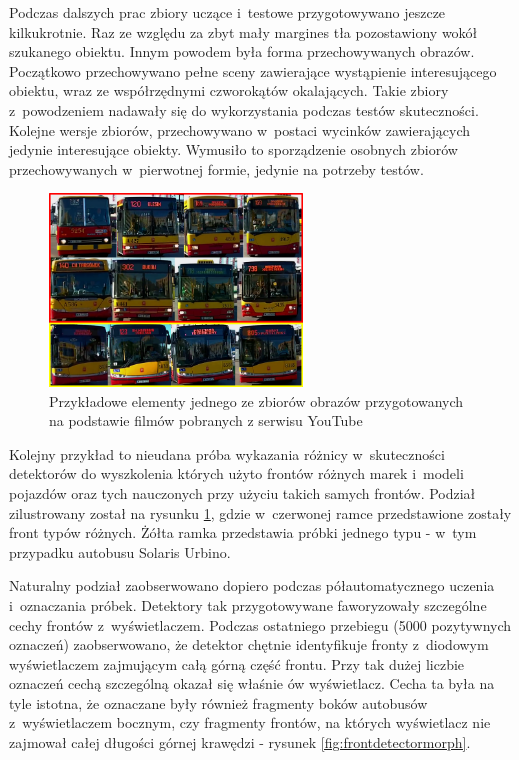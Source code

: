 Podczas dalszych prac zbiory uczące i~testowe przygotowywano jeszcze kilkukrotnie.
Raz ze względu
za zbyt mały margines tła pozostawiony wokół szukanego obiektu. Innym powodem 
była forma przechowywanych obrazów. Początkowo przechowywano pełne sceny zawierające wystąpienie
interesującego obiektu, wraz ze współrzędnymi czworokątów okalających.
Takie zbiory z~powodzeniem
nadawały się do wykorzystania podczas testów skuteczności. Kolejne wersje
zbiorów, przechowywano w~postaci wycinków zawierających jedynie interesujące obiekty.
Wymusiło to sporządzenie osobnych zbiorów przechowywanych w~pierwotnej formie, jedynie na potrzeby testów.

\begin{figure}[!h]
	\centering
	\includegraphics[width=0.6\textwidth]{img/exp_trainig_data_jJ9}
	\caption{Przykładowe elementy jednego ze zbiorów obrazów
		przygotowanych na podstawie
		filmów pobranych z serwisu YouTube}
	\label{fig:jJ9ixBfVR5k_types}
\end{figure}

Kolejny przykład to nieudana próba wykazania różnicy w~skuteczności detektorów
do wyszkolenia których użyto frontów różnych marek i~modeli pojazdów oraz tych
nauczonych przy użyciu takich samych frontów. Podział zilustrowany został na 
rysunku \ref{fig:jJ9ixBfVR5k_types}, gdzie w~czerwonej ramce przedstawione
zostały front typów różnych. Żółta ramka przedstawia próbki jednego typu - 
w~tym przypadku autobusu Solaris Urbino.


Naturalny podział zaobserwowano dopiero podczas półautomatycznego uczenia i~oznaczania
próbek.
Detektory tak przygotowywane faworyzowały
szczególne cechy frontów z~wyświetlaczem. Podczas ostatniego przebiegu
(5000 pozytywnych oznaczeń) zaobserwowano, że detektor
chętnie identyfikuje fronty z~diodowym wyświetlaczem zajmującym 
całą górną część frontu. Przy tak dużej liczbie oznaczeń
cechą szczególną okazał się właśnie ów wyświetlacz. Cecha ta była
na tyle istotna, że oznaczane były również fragmenty boków autobusów
z~wyświetlaczem bocznym, czy fragmenty frontów, na których wyświetlacz
nie zajmował całej długości górnej krawędzi - rysunek
\ref{fig:frontdetectormorph}.

